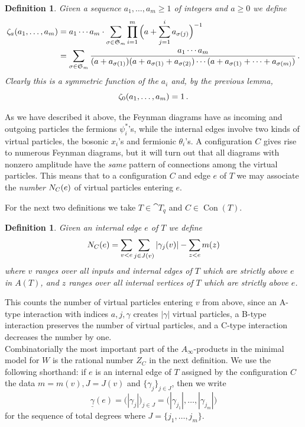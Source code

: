\documentclass[english,letter paper,12pt,leqno]{article}
\theoremstyle{example}
\newtheorem{definition}[theorem]{Definition}
\numberwithin{equation}{section}
\def\be{\begin{equation}}
\def\ee{\end{equation}}
\begin{document}
\begin{definition} Given a sequence $a_1,\ldots,a_m \ge 1$ of integers and $a \ge 0$ we define
\begin{align*}
\zeta_a(a_1, \ldots, a_m) &= a_1 \cdots a_m \cdot \sum_{\sigma \in \mathfrak{S}_m} \prod_{i=1}^{m} \Big( a + \sum_{j=1}^i a_{\sigma(j)} \Big)^{-1} \\
&= \sum_{\sigma \in \mathfrak{S}_m} \frac{a_1 \cdots a_m}{(a + a_{\sigma(1)}) (a + a_{\sigma(1)} + a_{\sigma(2)}) \cdots (a + a_{\sigma(1)} + \cdots + a_{\sigma(m)})}\,.
\end{align*}
Clearly this is a symmetric function of the $a_i$ and, by the previous lemma,
\be
\samp_0(a_1,\ldots,a_m) = 1\,.
\ee
\end{definition}

As we have described it above, the Feynman diagrams have as incoming and outgoing particles the fermions $\psi_i^*$'s, while the internal edges involve two kinds of virtual particles, the bosonic $x_i$'s and fermionic $\theta_i$'s. A configuration $C$ gives rise to numerous Feynman diagrams, but it will turn out that all diagrams with nonzero amplitude have the \emph{same} pattern of connections among the virtual particles. This means that to a configuration $C$ and edge $e$ of $T$ we may associate the \emph{number} $N_C(e)$ of virtual particles entering $e$.

For the next two definitions we take $T \in \cat{T}_q$ and $C \in \operatorname{Con}(T)$.

\begin{definition} Given an internal edge $e$ of $T$ we define
\[
N_C(e) = \sum_{v < e} \sum_{j \in J(v)} | \gamma_j(v) | - \sum_{z < e} m(z)
\]
where $v$ ranges over all inputs and internal edges of $T$ which are strictly above $e$ in $A(T)$, and $z$ ranges over all internal vertices of $T$ which are strictly above $e$.
\end{definition}

This counts the number of virtual particles entering $v$ from above, since an A-type interaction with indices $a,j,\gamma$ creates $|\gamma|$ virtual particles, a B-type interaction preserves the number of virtual particles, and a C-type interaction decreases the number by one.
\\

Combinatorially the most important part of the $A_\infty$-products in the minimal model for $W$ is the rational number $Z_C$ in the next definition. We use the following shorthand: if $e$ is an internal edge of $T$ assigned by the configuration $C$ the data $m = m(v), J = J(v)$ and $\{ \gamma_j \}_{j \in J}$, then we write
\be
\underline{\gamma}(e) = \big( |\gamma_j| \big)_{j \in J} = \big( |\gamma_{j_1}|, \ldots, |\gamma_{j_m}| \big)
\ee
for the sequence of total degrees where $J = \{j_1,\ldots,j_m\}$. 
\end{document}
